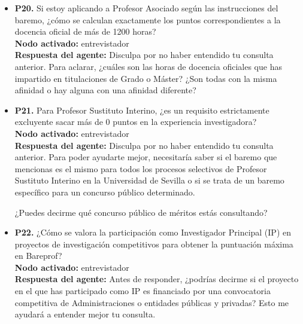 \documentclass{article}
\begin{document}
\begin{itemize}
            Sin embargo, en el documento "BAREMO 2024.pdf" (página 11), se proporciona información adicional sobre la experiencia docente. En este caso, para el puesto de Ayudante Doctor, se otorgan los siguientes puntos por cada hora impartida:

            \begin{itemize}
                \item Para el bloque 2.1. Experiencia docente, la puntuación máxima es de 45 puntos.
                \item Dentro del bloque 2.1. Experiencia docente, la puntuación para las horas impartidas en el caso de Ayudante Doctor se indica como "30" (puntos).
            \end{itemize}

            Por lo tanto, según la información proporcionada en ambos documentos, para el puesto de Ayudante Doctor, se otorgan \textbf{30 puntos por cada hora impartida}.

      \item \textbf{P20.} Si estoy aplicando a Profesor Asociado según las instrucciones del baremo, ¿cómo se calculan exactamente los puntos correspondientes a la docencia oficial de más de 1200 horas? \\
            \textbf{Nodo activado:} entrevistador \\
            \textbf{Respuesta del agente:} Disculpa por no haber entendido tu consulta anterior. Para aclarar, ¿cuáles son las horas de docencia oficiales que has impartido en titulaciones de Grado o Máster? ¿Son todas con la misma afinidad o hay alguna con una afinidad diferente?

      \item \textbf{P21.} Para Profesor Sustituto Interino, ¿es un requisito estrictamente excluyente sacar más de 0 puntos en la experiencia investigadora? \\
            \textbf{Nodo activado:} entrevistador \\
            \textbf{Respuesta del agente:} Disculpa por no haber entendido tu consulta anterior. Para poder ayudarte mejor, necesitaría saber si el baremo que mencionas es el mismo para todos los procesos selectivos de Profesor Sustituto Interino en la Universidad de Sevilla o si se trata de un baremo específico para un concurso público determinado.

            ¿Puedes decirme qué concurso público de méritos estás consultando?

      \item \textbf{P22.} ¿Cómo se valora la participación como Investigador Principal (IP) en proyectos de investigación competitivos para obtener la puntuación máxima en Bareprof? \\
            \textbf{Nodo activado:} entrevistador \\
            \textbf{Respuesta del agente:} Antes de responder, ¿podrías decirme si el proyecto en el que has participado como IP es financiado por una convocatoria competitiva de Administraciones o entidades públicas y privadas? Esto me ayudará a entender mejor tu consulta.


\end{itemize}
\end{document}
